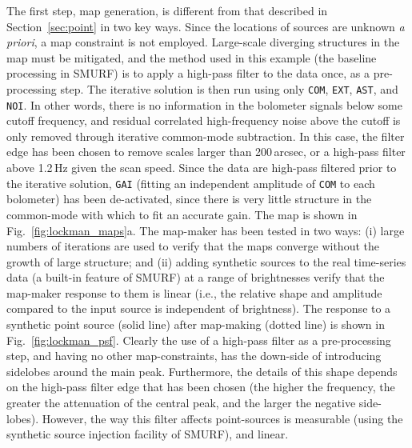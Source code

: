 \documentclass[useAMS,usenatbib,nofootinbib]{mn2e}
\newcommand{\model}[1]{\texttt{#1}}
\begin{document}
The first step, map generation, is different from that described in
Section~\ref{sec:point} in two key ways. Since the locations of
sources are unknown \emph{a priori}, a map constraint is not
employed. Large-scale diverging structures in the map must be
mitigated, and the method used in this example (the baseline
processing in SMURF) is to apply a high-pass filter to the data once,
as a pre-processing step. The iterative solution is then run using
only \model{COM}, \model{EXT}, \model{AST}, and \model{NOI}. In other
words, there is no information in the bolometer signals below some
cutoff frequency, and residual correlated high-frequency noise above
the cutoff is only removed through iterative common-mode
subtraction. In this case, the filter edge has been chosen to remove
scales larger than 200\,arcsec, or a high-pass filter above 1.2\,Hz
given the scan speed. Since the data are high-pass filtered prior to
the iterative solution, \model{GAI} (fitting an independent amplitude
of \model{COM} to each bolometer) has been de-activated, since there
is very little structure in the common-mode with which to fit an
accurate gain. The map is shown in Fig.~\ref{fig:lockman_maps}a. The
map-maker has been tested in two ways: (i) large numbers of iterations
are used to verify that the maps converge without the growth of large
structure; and (ii) adding synthetic sources to the real time-series
data (a built-in feature of SMURF) at a range of brightnesses verify
that the map-maker response to them is linear (i.e., the relative
shape and amplitude compared to the input source is independent of
brightness). The response to a synthetic point source (solid line)
after map-making (dotted line) is shown in
Fig.~\ref{fig:lockman_psf}. Clearly the use of a high-pass filter as a
pre-processing step, and having no other map-constraints, has the
down-side of introducing sidelobes around the main peak. Furthermore,
the details of this shape depends on the high-pass filter edge that
has been chosen (the higher the frequency, the greater the attenuation
of the central peak, and the larger the negative side-lobes).
However, the way this filter affects point-sources is measurable
(using the synthetic source injection facility of SMURF), and linear.
\end{document}
